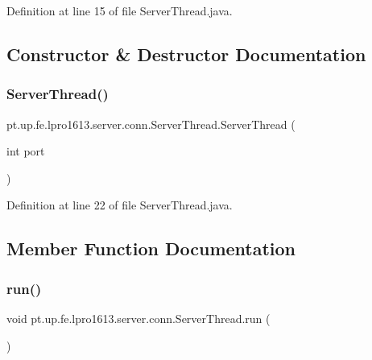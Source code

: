 Definition at line 15 of file Server\+Thread.\+java.



\subsection{Constructor \& Destructor Documentation}
\hypertarget{classpt_1_1up_1_1fe_1_1lpro1613_1_1server_1_1conn_1_1_server_thread_a2a2c941ac08b8354d3c5ffa721372244}{}\label{classpt_1_1up_1_1fe_1_1lpro1613_1_1server_1_1conn_1_1_server_thread_a2a2c941ac08b8354d3c5ffa721372244} 
\subsubsection{\texorpdfstring{Server\+Thread()}{ServerThread()}}
{\footnotesize\ttfamily pt.\+up.\+fe.\+lpro1613.\+server.\+conn.\+Server\+Thread.\+Server\+Thread (\begin{DoxyParamCaption}\item[{int}]{port }\end{DoxyParamCaption})}



Definition at line 22 of file Server\+Thread.\+java.



\subsection{Member Function Documentation}
\hypertarget{classpt_1_1up_1_1fe_1_1lpro1613_1_1server_1_1conn_1_1_server_thread_a78326abfc2bd35d8d4d3ac214ed3056c}{}\label{classpt_1_1up_1_1fe_1_1lpro1613_1_1server_1_1conn_1_1_server_thread_a78326abfc2bd35d8d4d3ac214ed3056c} 
\subsubsection{\texorpdfstring{run()}{run()}}
{\footnotesize\ttfamily void pt.\+up.\+fe.\+lpro1613.\+server.\+conn.\+Server\+Thread.\+run (\begin{DoxyParamCaption}{ }\end{DoxyParamCaption})}



